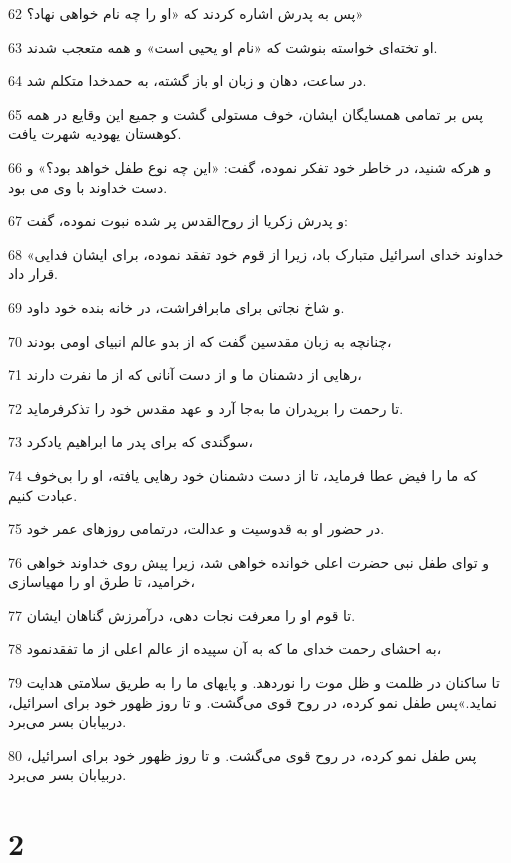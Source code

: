 \par 62 پس به پدرش اشاره کردند که «او را چه نام خواهی نهاد؟»
\par 63 او تخته‌ای خواسته بنوشت که «نام او یحیی است» و همه متعجب شدند.
\par 64 در ساعت، دهان و زبان او باز گشته، به حمدخدا متکلم شد.
\par 65 پس بر تمامی همسایگان ایشان، خوف مستولی گشت و جمیع این وقایع در همه کوهستان یهودیه شهرت یافت.
\par 66 و هرکه شنید، در خاطر خود تفکر نموده، گفت: «این چه نوع طفل خواهد بود؟» و دست خداوند با وی می بود.
\par 67 و پدرش زکریا از روح‌القدس پر شده نبوت نموده، گفت:
\par 68 «خداوند خدای اسرائیل متبارک باد، زیرا از قوم خود تفقد نموده، برای ایشان فدایی قرار داد.
\par 69 و شاخ نجاتی برای مابرافراشت، در خانه بنده خود داود.
\par 70 چنانچه به زبان مقدسین گفت که از بدو عالم انبیای اومی بودند،
\par 71 رهایی از دشمنان ما و از دست آنانی که از ما نفرت دارند،
\par 72 تا رحمت را برپدران ما به‌جا آرد و عهد مقدس خود را تذکرفرماید.
\par 73 سوگندی که برای پدر ما ابراهیم یادکرد،
\par 74 که ما را فیض عطا فرماید، تا از دست دشمنان خود رهایی یافته، او را بی‌خوف عبادت کنیم.
\par 75 در حضور او به قدوسیت و عدالت، درتمامی روزهای عمر خود.
\par 76 و تو‌ای طفل نبی حضرت اعلی خوانده خواهی شد، زیرا پیش روی خداوند خواهی خرامید، تا طرق او را مهیاسازی،
\par 77 تا قوم او را معرفت نجات دهی، درآمرزش گناهان ایشان.
\par 78 به احشای رحمت خدای ما که به آن سپیده از عالم اعلی از ما تفقدنمود،
\par 79 تا ساکنان در ظلمت و ظل موت را نوردهد. و پایهای ما را به طریق سلامتی هدایت نماید.»پس طفل نمو کرده، در روح قوی می‌گشت. و تا روز ظهور خود برای اسرائیل، دربیابان بسر می‌برد.
\par 80 پس طفل نمو کرده، در روح قوی می‌گشت. و تا روز ظهور خود برای اسرائیل، دربیابان بسر می‌برد.

\chapter{2}

